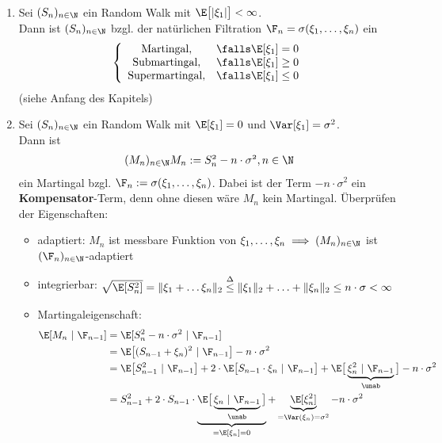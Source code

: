 \begin{beisp}\
\begin{enumerate}[label=(\alph*)]
\item Sei $(S_n)_{n\in\N}$ ein Random Walk mit $\E\big[|\xi_1|\big]<\infty$.\\
Dann ist $(S_n)_{n\in\N}$ bzgl. der natürlichen Filtration $\F_n=\sigma(\xi_1,\ldots,\xi_n)$ ein
\begin{align*}
\left\lbrace\begin{array}{cl}
\text{Martingal}, & \falls \E[\xi_1]=0\\
\text{Submartingal}, & \falls \E[\xi_1]\geq0\\
\text{Supermartingal}, & \falls \E[\xi_1]\leq0\\
\end{array}\right.
\end{align*}
(siehe Anfang des Kapitels)
\item Sei $(S_n)_{n\in\N}$ ein Random Walk mit $\E[\xi_1]=0$ und $\Var[\xi_1]=\sigma^2$.\\
Dann ist 
\begin{align*}
(M_n)_{n\in\N}\mit M_n:=S_n^2-n\cdot\sigma^2,n\in\N
\end{align*}
ein Martingal bzgl. $\F_n:=\sigma(\xi_1,\ldots,\xi_n)$. Dabei ist der Term $-n\cdot\sigma^2$ ein \textbf{Kompensator}-Term, denn ohne diesen wäre $M_n$ kein Martingal. Überprüfen der Eigenschaften:
\begin{itemize}
\item adaptiert: $M_n$ ist messbare Funktion von $\xi_1,\ldots,\xi_n\implies(M_n)_{n\in\N}$ ist $(\F_n)_{n\in\N}$-adaptiert
\item integrierbar: $\begin{aligned}
\sqrt{\E[S_n^2]}=\Vert\xi_1+\ldots\xi_n\Vert_2\stackrel{\Delta}{\leq}\Vert\xi_1\Vert_2+\ldots+\Vert\xi_n\Vert_2\leq n\cdot\sigma<\infty
\end{aligned}$
\item Martingaleigenschaft:
\begin{align*}
\E[M_n~|~\F_{n-1}]
&=\E[S_n^2-n\cdot\sigma^2~|~\F_{n-1}]\\
&=\E\big[(S_{n-1}+\xi_n)^2~|~\F_{n-1}\big]-n\cdot\sigma^2\\
&=\E\big[S_{n-1}^2~|~\F_{n-1}\big]+2\cdot\E\big[S_{n-1}\cdot\xi_n~|~\F_{n-1}\big]+\E\big[\underbrace{\xi_n^2~|~\F_{n-1}}_{\unab}\big]-n\cdot\sigma^2\\
&=S_{n-1}^2+2\cdot S_{n-1}\cdot \underbrace{\E\big[\underbrace{\xi_n~|~\F_{n-1}}_{\unab}\big]}_{=\E[\xi_n]=0}+\underbrace{\E[\xi_n^2]}_{=\Var(\xi_n)=\sigma^2}-n\cdot\sigma^2\\

\end{align*}
\end{itemize}
\end{enumerate}
\end{beisp}
